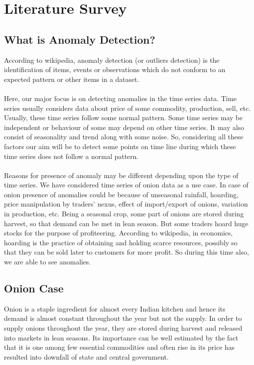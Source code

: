 \chapter{Literature Survey}


\section{What is Anomaly Detection?}

According to wikipedia, anomaly detection (or outliers detection) is the identification of items, events or observations which do not conform to an expected pattern or other items in a dataset.\\
\\
Here, our major focus is on detecting anomalies in the time series data. Time series usually considers data about price of some commodity, production, sell, etc. Usually, these time series follow some normal pattern. Some time series may be independent or behaviour of some may depend on other time series. It may also consist of seasonality and trend along with some noise. So, considering all these factors our aim will be to detect some points on time line during which these time series does not follow a normal pattern.\\
\\
Reasons for presence of anomaly may be different depending upon the type of time series. We have considered time series of onion data as a use case. In case of onion presence of anomalies could be because of unseasonal rainfall, hoarding, price manipulation by traders' nexus, effect of import/export of onions, variation in production, etc. Being a seasonal crop, some part of onions are stored during harvest, so that demand can be met in lean season. But some traders hoard huge stocks for the purpose of profiteering. According to wikipedia, in economics, hoarding is the practice of obtaining and holding scarce resources, possibly so that they can be sold later to customers for more profit. So during this time also, we are able to see anomalies.


\section{Onion Case}


Onion is a staple ingredient for almost every Indian kitchen and hence its demand is almost constant throughout the year but not the supply. In order to supply onions throughout the year, they are stored during harvest and released into markets in lean seasons. Its importance can be well estimated by the fact that it is one among few essential commodities and often rise in its price has resulted into downfall of state and central government.

